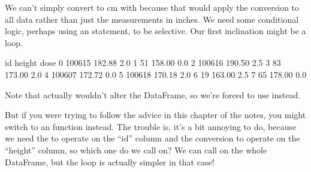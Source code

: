 \documentclass[letterpaper,10pt,english]{jupyterBook}
\begin{document}
\sphinxAtStartPar
We can’t simply convert to cm with  because that would apply the conversion to all data rather than just the measurements in inches.  We need some conditional logic, perhaps using an  statement, to be selective.  Our first inclination might be a loop.

\begin{sphinxVerbatim}[commandchars=\\\{\}]
  

   
     \PYG{p}{[}\PYG{p}{]}    
        \PYG{p}{[}\PYG{p}{]}  
\end{sphinxVerbatim}

\begin{sphinxVerbatim}[commandchars=\\\{\}]
       id  height  dose
0  100615  182.88   2.0
1      51  158.00   0.0
2  100616  190.50   2.5
3      83  173.00   2.0
4  100607  172.72   0.0
5  100618  170.18   2.0
6      19  163.00   2.5
7      65  178.00   0.0
\end{sphinxVerbatim}

\sphinxAtStartPar
Note that  actually wouldn’t alter the DataFrame, so we’re forced to use  instead.

\sphinxAtStartPar
But if you were trying to follow the advice in this chapter of the notes, you might switch to an  function instead.  The trouble is, it’s a bit annoying to do, because we need the  to operate on the “id” column and the conversion to operate on the “height” column, so which one do we call  on?  We can call  on the whole DataFrame, but the loop is actually simpler in that case!
\end{document}
